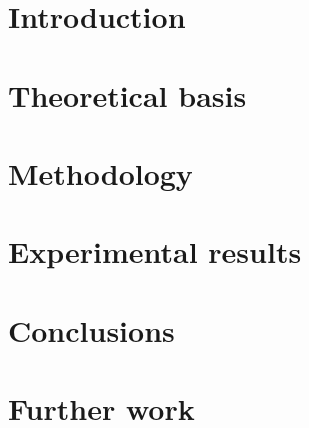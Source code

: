 \documentclass[11pt,a4paper]{article}
\begin{document}
	\begin{abstract}

	\end{abstract}

\newpage

	\renewcommand{\abstractname}{Acknowledgements}
	\begin{abstract}
		
	\end{abstract}

\newpage

	\tableofcontents
    \listoffigures

\newpage

	\section{Introduction}

	\section{Theoretical basis}

	\section{Methodology}

	\section{Experimental results}

	\section{Conclusions}

	\section{Further work}
\end{document}
